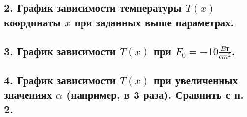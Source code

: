 \documentclass[a4paper,oneside,12pt]{extreport}
\begin{document}
\clearpage

\subsection{2. График зависимости температуры $T(x)$ координаты $x$ при заданных выше параметрах.}

\begin{figure}[ht!]
\end{figure}

\subsection{3. График зависимости $T(x)$ при $F_{0} = -10 \frac{Bт}{cm^2}$. }

\begin{figure}[ht!]
\end{figure}

\subsection{4. График зависимости $T(x)$ при увеличенных значениях $\alpha$ (например, в 3 раза). Сравнить с п. 2.}
\end{document}
